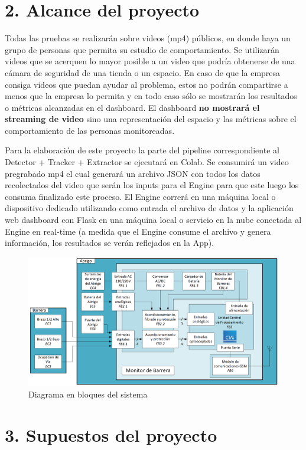 \documentclass[11pt]{charter}
\begin{document}
\section{2. Alcance del proyecto}
\label{sec:alcance}
Todas las pruebas se realizarán sobre videos (mp4) públicos, en donde haya un grupo de personas que permita su estudio de comportamiento. Se utilizarán videos que se acerquen lo mayor posible a un video que podría obtenerse de una cámara de seguridad de una tienda o un espacio. En caso de que la empresa consiga videos que puedan ayudar al problema, estos no podrán compartirse a menos que la empresa lo permita y en todo caso sólo se mostrarán los resultados o métricas alcanzadas en el dashboard. El dashboard \textbf{no mostrará el streaming de video} sino una representación del espacio y las métricas sobre el comportamiento de las personas monitoreadas.

Para la elaboración de este proyecto la parte del pipeline correspondiente al Detector + Tracker + Extractor se ejecutará en Colab. Se consumirá un video pregrabado mp4 el cual generará un archivo JSON con todos los datos recolectados del video que serán los inputs para el Engine para que este luego los consuma finalizado este proceso. El Engine correrá en una máquina local o dispositivo dedicado utilizando como entrada el archivo de datos y la aplicación web dashboard con Flask en una máquina local o servicio en la nube conectada al Engine en real-time (a medida que el Engine consume el archivo y genera información, los resultados se verán reflejados en la App).

\begin{figure}[htpb]
\centering 
\includegraphics[width=.7\textwidth]{./Figuras/diagBloques.png}
\caption{Diagrama en bloques del sistema}
\label{fig:diagBloques}
\end{figure}

\section{3. Supuestos del proyecto}
\label{sec:supuestos}
\end{document}
